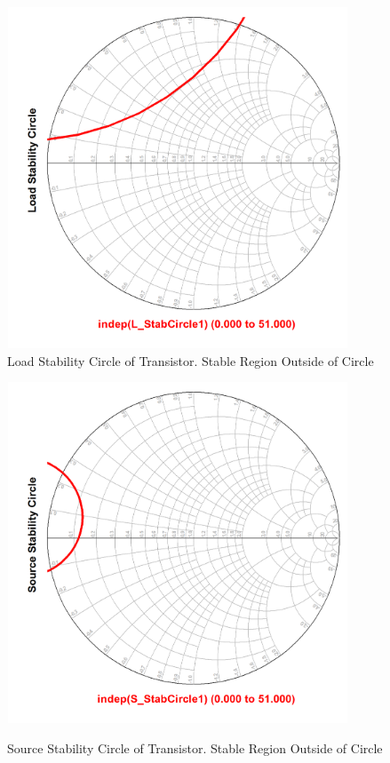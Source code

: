 \begin{figure}
  \centering
  \includegraphics[width=4in,height=4in,keepaspectratio]{figures/simulation/load_stab}\\
  \caption{Load Stability Circle of Transistor. Stable Region Outside of Circle}
  \label{fig:load_stab}

  \vspace*{\floatsep}

  \centering
  \includegraphics[width=4in,height=4in,keepaspectratio]{figures/simulation/source_stab}\\
  \caption{Source Stability Circle of Transistor. Stable Region Outside of Circle}
  \label{fig:source_stab}
\end{figure}



